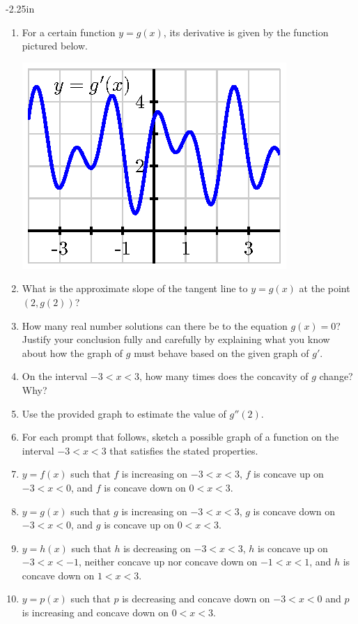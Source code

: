 \begin{adjustwidth*}{}{-2.25in}
\begin{multicols*}{2}
\begin{enumerate}[1),resume]
\item For a certain function $y = g(x)$, its derivative is given by the function pictured below.
\begin{center}
\includegraphics[scale=.75]{figures/1_6_Ez2.eps}
\end{center}
\ba
	\item What is the approximate slope of the tangent line to $y = g(x)$ at the point $(2,g(2))$?
	\item How many real number solutions can there be to the equation $g(x) = 0$?  Justify your conclusion fully and carefully by explaining what you know about how the graph of $g$ must behave based on the given graph of $g'$.
	\item On the interval $-3 < x < 3$, how many times does the concavity of $g$ change?  Why?
	\item Use the provided graph to estimate the value of $g''(2)$.
\ea

\item For each prompt that follows, sketch a possible graph of a function on the interval $-3 < x < 3$ that satisfies the stated properties.
\ba
	\item $y = f(x)$ such that $f$ is increasing on $-3 < x < 3$, $f$ is concave up on $-3 < x < 0$, and $f$ is concave down on $0 < x < 3$.
	\item $y = g(x)$ such that $g$ is increasing on $-3 < x < 3$, $g$ is concave down on $-3 < x < 0$, and $g$ is concave up on $0 < x < 3$.
	\item $y = h(x)$ such that $h$ is decreasing on $-3 < x < 3$, $h$ is concave up on $-3 < x < -1$, neither concave up nor concave down on $-1 < x < 1$, and $h$ is concave down on $1 < x < 3$.
	\item $y = p(x)$ such that $p$ is decreasing and concave down on $-3 < x < 0$ and $p$ is increasing and concave down on $0 < x < 3$.
\ea


\end{enumerate}
\end{multicols*}
\end{adjustwidth*}

